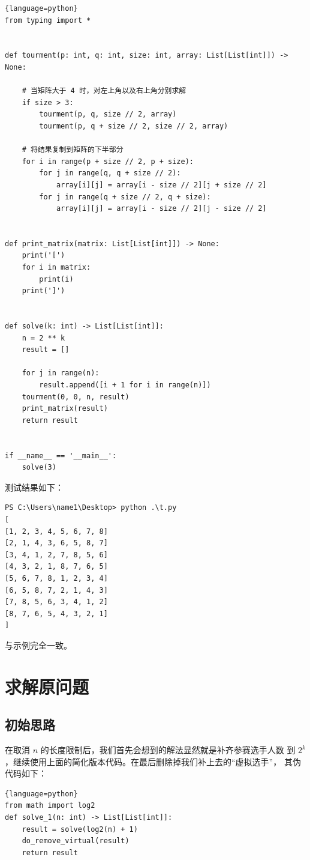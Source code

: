 \documentclass[ichigo,normal,cn]{elegantnote_mod}
\begin{document}
\begin{lstlisting}{language=python}
from typing import *


def tourment(p: int, q: int, size: int, array: List[List[int]]) -> None:

    # 当矩阵大于 4 时，对左上角以及右上角分别求解
    if size > 3:
        tourment(p, q, size // 2, array)
        tourment(p, q + size // 2, size // 2, array)

    # 将结果复制到矩阵的下半部分
    for i in range(p + size // 2, p + size):
        for j in range(q, q + size // 2):
            array[i][j] = array[i - size // 2][j + size // 2]
        for j in range(q + size // 2, q + size):
            array[i][j] = array[i - size // 2][j - size // 2]


def print_matrix(matrix: List[List[int]]) -> None:
    print('[')
    for i in matrix:
        print(i)
    print(']')


def solve(k: int) -> List[List[int]]:
    n = 2 ** k
    result = []

    for j in range(n):
        result.append([i + 1 for i in range(n)])
    tourment(0, 0, n, result)
    print_matrix(result)
    return result


if __name__ == '__main__':
    solve(3)

\end{lstlisting}

测试结果如下：

\begin{lstlisting}
PS C:\Users\name1\Desktop> python .\t.py
[
[1, 2, 3, 4, 5, 6, 7, 8]
[2, 1, 4, 3, 6, 5, 8, 7]
[3, 4, 1, 2, 7, 8, 5, 6]
[4, 3, 2, 1, 8, 7, 6, 5]
[5, 6, 7, 8, 1, 2, 3, 4]
[6, 5, 8, 7, 2, 1, 4, 3]
[7, 8, 5, 6, 3, 4, 1, 2]
[8, 7, 6, 5, 4, 3, 2, 1]
]
\end{lstlisting}

与示例完全一致。

\section{求解原问题}
\subsection{初始思路}
在取消 $n$ 的长度限制后，我们首先会想到的解法显然就是补齐参赛选手人数
到 $2^k$，继续使用上面的简化版本代码。在最后删除掉我们补上去的``虚拟选手''，
其伪代码如下：

\begin{lstlisting}{language=python}
from math import log2
def solve_1(n: int) -> List[List[int]]:
    result = solve(log2(n) + 1)
    do_remove_virtual(result)
    return result
\end{lstlisting}
\end{document}
